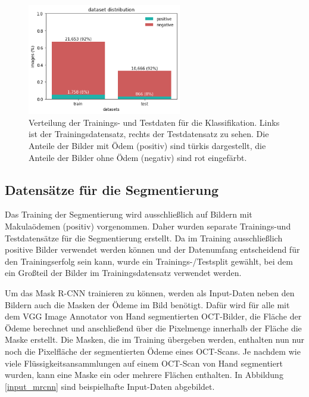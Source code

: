 \begin{figure}[H]
\centering
\includegraphics[width=0.6\textwidth]{./pic/Datenvorverarbeitung/classes.png}
\caption{\label{fig:dataset_distribution}Verteilung der Trainings- und Testdaten für die Klassifikation. Links ist der Trainingsdatensatz, rechts der Testdatensatz zu sehen. Die Anteile der Bilder mit Ödem (positiv) sind türkis dargestellt, die Anteile der Bilder ohne Ödem (negativ) sind rot eingefärbt.}
\end{figure}

\subsection{Datensätze für die Segmentierung}
Das Training der Segmentierung wird ausschließlich auf Bildern mit Makulaödemen (positiv) vorgenommen. Daher wurden separate Trainings-und Testdatensätze für die Segmentierung erstellt.\newline
Da im Training ausschließlich positive Bilder verwendet werden können und der Datenumfang entscheidend für den Trainingserfolg sein kann, wurde ein Trainings-/Testsplit gewählt, bei dem ein Großteil der Bilder im Trainingsdatensatz verwendet werden.


Um das Mask R-CNN trainieren zu können, werden als Input-Daten neben den Bildern auch die Masken der Ödeme im Bild benötigt. Dafür wird für alle mit dem VGG Image Annotator von Hand segmentierten OCT-Bilder, die Fläche der Ödeme berechnet und anschließend über die Pixelmenge innerhalb der Fläche die Maske erstellt. 
Die Masken, die im Training übergeben werden, enthalten nun nur noch die Pixelfläche der segmentierten Ödeme eines OCT-Scans. Je nachdem wie viele Flüssigkeitsansammlungen auf einem OCT-Scan von Hand segmentiert wurden, kann eine Maske ein oder mehrere Flächen enthalten. 
In Abbildung \ref{input_mrcnn} sind beispielhafte Input-Daten abgebildet. 

